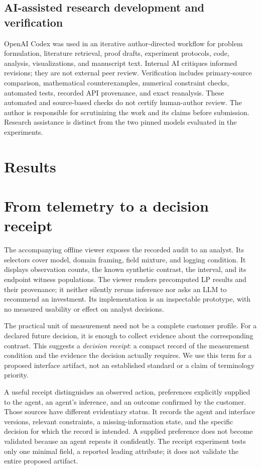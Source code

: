 \documentclass[10pt,twocolumn]{article}
\theoremstyle{definition}\newtheorem{definition}[theorem]{Definition}
\newcommand{\1}{\mathbf 1}
\begin{document}
\subsection{AI-assisted research development and verification}
OpenAI Codex was used in an iterative author-directed workflow for problem formulation, literature retrieval, proof drafts, experiment protocols, code, analysis, visualizations, and manuscript text. Internal AI critiques informed revisions; they are not external peer review. Verification includes primary-source comparison, mathematical counterexamples, numerical constraint checks, automated tests, recorded API provenance, and exact reanalysis. These automated and source-based checks do not certify human-author review. The author is responsible for scrutinizing the work and its claims before submission. Research assistance is distinct from the two pinned models evaluated in the experiments.

\section{Results}




\section{From telemetry to a decision receipt}
The accompanying offline viewer exposes the recorded audit to an analyst. Its selectors cover model, domain framing, field mixture, and logging condition. It displays observation counts, the known synthetic contrast, the interval, and its endpoint witness populations. The viewer renders precomputed LP results and their provenance; it neither silently reruns inference nor asks an LLM to recommend an investment. Its implementation is an inspectable prototype, with no measured usability or effect on analyst decisions.

The practical unit of measurement need not be a complete customer profile. For a declared future decision, it is enough to collect evidence about the corresponding contrast. This suggests a \emph{decision receipt}: a compact record of the measurement condition and the evidence the decision actually requires. We use this term for a proposed interface artifact, not an established standard or a claim of terminology priority.

A useful receipt distinguishes an observed action, preferences explicitly supplied to the agent, an agent's inference, and an outcome confirmed by the customer. Those sources have different evidentiary status. It records the agent and interface versions, relevant constraints, a missing-information state, and the specific decision for which the record is intended. A supplied preference does not become validated because an agent repeats it confidently. The receipt experiment tests only one minimal field, a reported leading attribute; it does not validate the entire proposed artifact.
\end{document}
